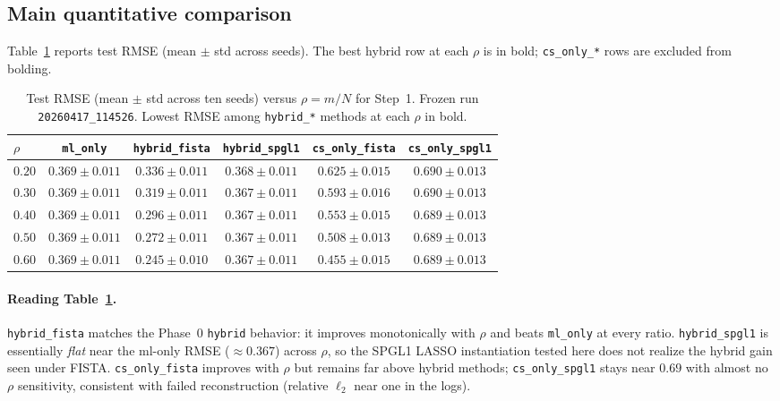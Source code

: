 \subsection{Main quantitative comparison}
\label{sec:solver_main_table}

Table~\ref{tab:solver_rmse} reports test RMSE (mean $\pm$ std across seeds).
The best hybrid row at each $\rho$ is in bold; \texttt{cs\_only\_*} rows are excluded from bolding.

\begin{table}[t]
  \centering
  \caption{Test RMSE (mean $\pm$ std across ten seeds) versus $\rho=m/N$ for Step~1.
  Frozen run \texttt{20260417\_114526}. Lowest RMSE among \texttt{hybrid\_*} methods at each $\rho$ in bold.}
  \label{tab:solver_rmse}
  \begin{tabular}{@{}lccccc@{}}
    \toprule
    $\rho$ & \texttt{ml\_only} & \texttt{hybrid\_fista} & \texttt{hybrid\_spgl1} & \texttt{cs\_only\_fista} & \texttt{cs\_only\_spgl1} \\
    \midrule
    $0.20$ & $0.369 \pm 0.011$ & $\mathbf{0.336 \pm 0.011}$ & $0.368 \pm 0.011$ & $0.625 \pm 0.015$ & $0.690 \pm 0.013$ \\
    $0.30$ & $0.369 \pm 0.011$ & $\mathbf{0.319 \pm 0.011}$ & $0.367 \pm 0.011$ & $0.593 \pm 0.016$ & $0.690 \pm 0.013$ \\
    $0.40$ & $0.369 \pm 0.011$ & $\mathbf{0.296 \pm 0.011}$ & $0.367 \pm 0.011$ & $0.553 \pm 0.015$ & $0.689 \pm 0.013$ \\
    $0.50$ & $0.369 \pm 0.011$ & $\mathbf{0.272 \pm 0.011}$ & $0.367 \pm 0.011$ & $0.508 \pm 0.013$ & $0.689 \pm 0.013$ \\
    $0.60$ & $0.369 \pm 0.011$ & $\mathbf{0.245 \pm 0.010}$ & $0.367 \pm 0.011$ & $0.455 \pm 0.015$ & $0.689 \pm 0.013$ \\
    \bottomrule
  \end{tabular}
\end{table}

\paragraph{Reading Table~\ref{tab:solver_rmse}.}
\texttt{hybrid\_fista} matches the Phase~0 \texttt{hybrid} behavior: it improves monotonically with $\rho$ and beats \texttt{ml\_only} at every ratio.
\texttt{hybrid\_spgl1} is essentially \emph{flat} near the ml-only RMSE ($\approx 0.367$) across $\rho$, so the SPGL1 LASSO instantiation tested here does not realize the hybrid gain seen under FISTA.
\texttt{cs\_only\_fista} improves with $\rho$ but remains far above hybrid methods; \texttt{cs\_only\_spgl1} stays near $0.69$ with almost no $\rho$ sensitivity, consistent with failed reconstruction (relative $\ell_2$ near one in the logs).


